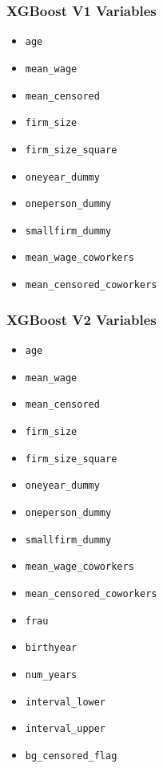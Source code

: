 \documentclass{article}
\begin{document}
\subsubsection{XGBoost V1 Variables}

\begin{itemize}
    \item \texttt{age}
    \item \texttt{mean\_wage}
    \item \texttt{mean\_censored}
    \item \texttt{firm\_size}
    \item \texttt{firm\_size\_square}
    \item \texttt{oneyear\_dummy}
    \item \texttt{oneperson\_dummy}
    \item \texttt{smallfirm\_dummy}
    \item \texttt{mean\_wage\_coworkers}
    \item \texttt{mean\_censored\_coworkers}
\end{itemize}

\subsubsection{XGBoost V2 Variables}

\begin{itemize}
    \item \texttt{age}
    \item \texttt{mean\_wage}
    \item \texttt{mean\_censored}
    \item \texttt{firm\_size}
    \item \texttt{firm\_size\_square}
    \item \texttt{oneyear\_dummy}
    \item \texttt{oneperson\_dummy}
    \item \texttt{smallfirm\_dummy}
    \item \texttt{mean\_wage\_coworkers}
    \item \texttt{mean\_censored\_coworkers}
    \item \texttt{frau}
    \item \texttt{birthyear}
    \item \texttt{num\_years}
    \item \texttt{interval\_lower}
    \item \texttt{interval\_upper}
    \item \texttt{bg\_censored\_flag}
\end{itemize}
\end{document}
